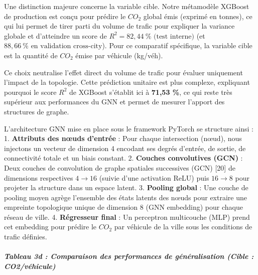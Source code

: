 \documentclass[10pt, a4paper]{article}
\begin{document}
Une distinction majeure concerne la variable cible. Notre métamodèle
XGBoost de production est conçu pour prédire le \(CO_2\) global émis
(exprimé en tonnes), ce qui lui permet de tirer parti du volume de
trafic pour expliquer la variance globale et d'atteindre un score de
\textbf{\(R^2 = 82{,}44\ \% \text{ (test interne)}\)} (et
\textbf{\(88{,}66\ \% \text{ en validation cross-city}\)}). Pour ce
comparatif spécifique, la variable cible est la quantité de \(CO_2\)
émise par véhicule (kg/véh).

Ce choix neutralise l'effet direct du volume de trafic pour évaluer
uniquement l'impact de la topologie. Cette prédiction unitaire est plus
complexe, expliquant pourquoi le score \(R^2\) de XGBoost s'établit ici
à \textbf{71,53 \%}, ce qui reste très supérieur aux performances du GNN
et permet de mesurer l'apport des structures de graphe.

L'architecture GNN mise en place sous le framework PyTorch se structure
ainsi : 1. \textbf{Attributs des nœuds d'entrée} : Pour chaque
intersection (nœud), nous injectons un vecteur de dimension 4 encodant
ses degrés d'entrée, de sortie, de connectivité totale et un biais
constant. 2. \textbf{Couches convolutives (GCN)} : Deux couches de
convolution de graphe spatiales successives (GCN) {[}20{]} de dimensions
respectives \(4 \rightarrow 16\) (suivie d'une activation ReLU) puis
\(16 \rightarrow 8\) pour projeter la structure dans un espace latent.
3. \textbf{Pooling global} : Une couche de pooling moyen agrège
l'ensemble des états latents des nœuds pour extraire une empreinte
topologique unique de dimension 8 (GNN embedding) pour chaque réseau de
ville. 4. \textbf{Régresseur final} : Un perceptron multicouche (MLP)
prend cet embedding pour prédire le \(CO_2\) par véhicule de la ville
sous les conditions de trafic définies.

\subparagraph{Tableau 3d : Comparaison des performances de
généralisation (Cible :
CO2/véhicule)}\label{tableau-3d-comparaison-des-performances-de-guxe9nuxe9ralisation-cible-co2vuxe9hicule}
\end{document}
